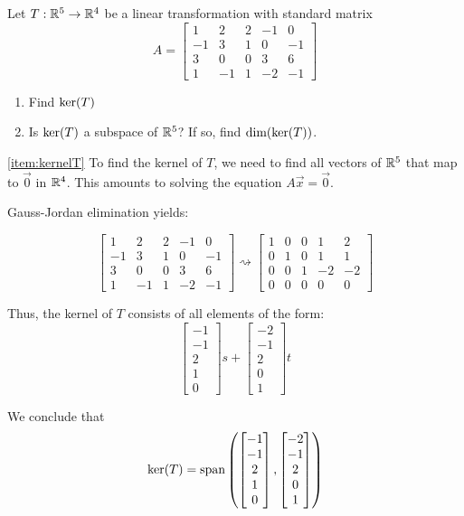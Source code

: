 \documentclass{ximera}
\begin{document}
\begin{example}\label{ex:kernel} Let $T:\mathbb{R}^5\rightarrow \mathbb{R}^4$ be a linear transformation with standard matrix $$A=\begin{bmatrix}1 & 2 & 2 &-1 & 0\\-1 & 3 & 1 & 0 & -1\\3 & 0 & 0 & 3 & 6\\ 1 & -1 & 1 & -2 & -1\end{bmatrix}$$
\begin{enumerate}
\item \label{item:kernelT}
Find $\textnormal{ker}(T)$
\item \label{item:dimkernelT}
Is $\textnormal{ker}(T)$ a subspace of $\mathbb{R}^5$?  If so, find $\textnormal{dim}(\textnormal{ker}(T))$.
\end{enumerate}
\begin{explanation}
\ref{item:kernelT} To find the kernel of $T$, we need to find all vectors of $\mathbb{R}^5$ that map to $\vec{0}$ in $\mathbb{R}^4$.  This amounts to solving the equation $A\vec{x}=\vec{0}$.

Gauss-Jordan elimination yields:

$$\begin{bmatrix}1 & 2 & 2 &-1 & 0\\-1 & 3 & 1 & 0 & -1\\3 & 0 & 0 & 3 & 6\\ 1 & -1 & 1 & -2 & -1\end{bmatrix}  \rightsquigarrow \begin{bmatrix} 1 & 0 & 0 & 1 & 2\\0 & 1 & 0 & 1 & 1\\0 & 0 & 1 & -2 & -2\\ 0 & 0 & 0 & 0 & 0 \end{bmatrix}$$

Thus, the kernel of $T$ consists of all elements of the form:
$$\begin{bmatrix}-1\\-1\\2\\1\\0\end{bmatrix}s+\begin{bmatrix}-2\\-1\\2\\0\\1\end{bmatrix}t$$

We conclude that 
$$\textnormal{ker}(T)=\textnormal{span}\left(\begin{bmatrix}-1\\-1\\2\\1\\0\end{bmatrix}, \begin{bmatrix}-2\\-1\\2\\0\\1\end{bmatrix}\right)$$


\end{explanation}
\end{example}
\end{document}
